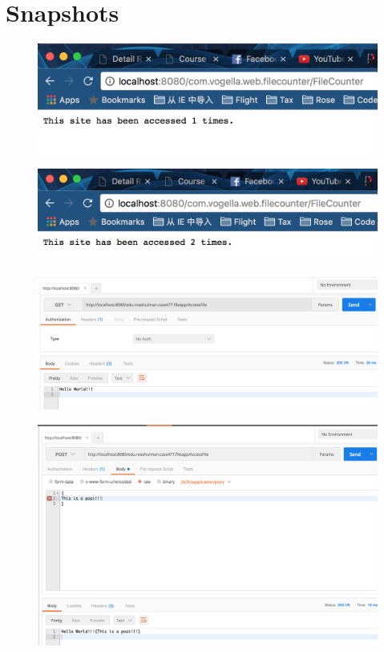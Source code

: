 \documentclass[12pt,letterpaper,boxed]{hmcpset}
\begin{document}
\section*{Snapshots}
\begin{figure}[H]
  \centering
  \includegraphics[width = 1.0\textwidth]{1.png}
\end{figure}
\begin{figure}[H]
  \centering
  \includegraphics[width = 1.0\textwidth]{2.png}
\end{figure}
\begin{figure}[H]
  \centering
  \includegraphics[width = 1.0\textwidth]{get.png}
\end{figure}
\begin{figure}[H]
  \centering
  \includegraphics[width = 1.0\textwidth]{post.png}
\end{figure}
\end{document}
